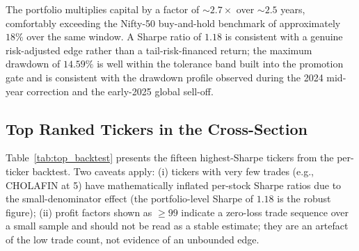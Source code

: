 The portfolio multiplies capital by a factor of $\sim\!2.7\times$ over $\sim\!2.5$ years, comfortably exceeding the Nifty-50 buy-and-hold benchmark of approximately $18\%$ over the same window. A Sharpe ratio of $1.18$ is consistent with a genuine risk-adjusted edge rather than a tail-risk-financed return; the maximum drawdown of $14.59\%$ is well within the tolerance band built into the promotion gate and is consistent with the drawdown profile observed during the 2024 mid-year correction and the early-2025 global sell-off.

\subsection{Top Ranked Tickers in the Cross-Section}

Table~\ref{tab:top_backtest} presents the fifteen highest-Sharpe tickers from the per-ticker backtest. Two caveats apply: (i) tickers with very few trades (e.g., CHOLAFIN at 5) have mathematically inflated per-stock Sharpe ratios due to the small-denominator effect (the portfolio-level Sharpe of $1.18$ is the robust figure); (ii) profit factors shown as $\geq 99$ indicate a zero-loss trade sequence over a small sample and should not be read as a stable estimate; they are an artefact of the low trade count, not evidence of an unbounded edge.

